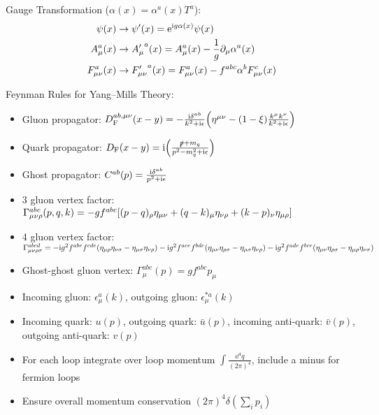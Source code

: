 		\noindent
		Gauge Transformation ($\alpha(x) = \alpha^a(x) T^a$):
		\begin{equation}
			\begin{aligned}
				\psi(x) & \to \psi'(x) = \mathrm{e}^{\mathrm{i} g \alpha(x)} \psi(x) \\
				A_\mu^a(x) & \to {A'_\mu}^a(x) = A_\mu^a(x) - \frac{1}{g} \partial_\mu \alpha^a(x) \\
				F_{\mu\nu}^a(x) & \to {F'_{\mu\nu}}^a(x) = F_{\mu\nu}^a(x) - f^{abc} \alpha^b F_{\mu\nu}^c(x)
			\end{aligned}
		\end{equation}

		\noindent
		Feynman Rules for Yang--Mills Theory:
		\begin{itemize}\itemsep -0pt
			\item Gluon propagator: $D_\text{F}^{ab,\mu\nu}(x-y) = -\frac{\mathrm{i} \delta^{ab}}{k^2+\mathrm{i}\epsilon} \qty(\eta^{\mu\nu}-(1-\xi)\frac{k^\mu k^\nu}{k^2+\mathrm{i}\epsilon} )$
			\item Quark propagator: $D_\text{F}(x-y) = \mathrm{i}\qty(\frac{\slashed{p}+m_q}{p^2-m_q^2+\mathrm{i}\epsilon})$
			\item Ghost propagator: $C^{ab}(p) = \frac{\mathrm{i}\delta^{ab}}{p^2+\mathrm{i}\epsilon}$
			\item 3 gluon vertex factor: $\Gamma^{abc}_{\mu\nu\rho}(p,q,k) = -gf^{abc} \qty[(p-q)_\rho \eta_{\mu\nu} + (q-k)_\mu \eta_{\nu\rho} + (k-p)_\nu \eta_{\mu\rho}]$
			\item 4 gluon vertex factor: $\Gamma^{abcd}_{\mu\nu\rho\sigma} = -\mathrm{i} g^2 f^{abe}f^{cde}(\eta_{\mu\rho}\eta_{\nu\sigma} - \eta_{\mu\sigma}\eta_{\nu\rho}) - \mathrm{i} g^2 f^{ace}f^{bde} (\eta_{\mu\nu}\eta_{\rho\sigma} - \eta_{\mu\sigma}\eta_{\nu\rho}) - \mathrm{i} g^2 f^{ade} f^{bce} (\eta_{\mu\nu}\eta_{\rho\sigma} - \eta_{\mu\rho}\eta_{\nu\sigma})$
			\item Ghost-ghost gluon vertex: $\Gamma^{abc}_\mu(p) = gf^{abc} p_\mu$
			\item Incoming gluon: $\epsilon^a_\mu(k)$, outgoing gluon: $\epsilon^{*a}_\mu(k)$
			\item Incoming quark: $u(p)$, outgoing quark: $\bar{u}(p)$, incoming anti-quark: $\bar{v}(p)$, outgoing anti-quark: $v(p)$
			\item For each loop integrate over loop momentum $\int \frac{\dd^4 q}{(2\pi)^4}$, include a minus for fermion loops
			\item Ensure overall momentum conservation $(2\pi)^4 \delta(\sum_i p_i)$
		\end{itemize}

